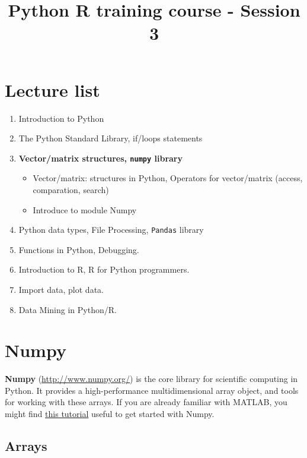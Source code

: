 \documentclass[11pt]{article}
\title{Python R training course - Session 3}
\providecommand{\tightlist}{%
      \setlength{\itemsep}{0pt}\setlength{\parskip}{0pt}}
\begin{document}
    
    
    \maketitle
    
    

    
    \section{Lecture list}\label{lecture-list}

\begin{enumerate}
\def\labelenumi{\arabic{enumi}.}
\item
  Introduction to Python
\item
  The Python Standard Library, if/loops statements
\item
  \textbf{Vector/matrix structures, \texttt{numpy} library}

  \begin{itemize}
  \tightlist
  \item
    Vector/matrix: structures in Python, Operators for vector/matrix
    (access, comparation, search)
  \item
    Introduce to module Numpy
  \end{itemize}
\item
  Python data types, File Processing, \texttt{Pandas} library
\item
  Functions in Python, Debugging.
\item
  Introduction to R, R for Python programmers.
\item
  Import data, plot data.
\item
  Data Mining in Python/R.
\end{enumerate}

    \section{Numpy}\label{numpy}

\textbf{Numpy} (\url{http://www.numpy.org/}) is the core library for
scientific computing in Python. It provides a high-performance
multidimensional array object, and tools for working with these arrays.
If you are already familiar with MATLAB, you might find
\href{http://wiki.scipy.org/NumPy_for_Matlab_Users}{this tutorial}
useful to get started with Numpy.

    \subsection{Arrays}\label{arrays}
\end{document}
